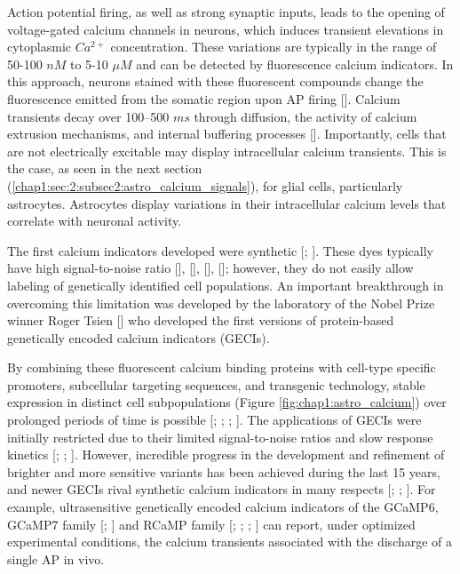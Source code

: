 Action potential firing, as well as strong synaptic inputs, leads to the opening of voltage-gated calcium channels in neurons, which induces transient elevations in cytoplasmic $Ca^{2+}$ concentration.
These variations are typically in the range of 50-100 $nM$ to 5-10 $\mu M$ and can be detected by fluorescence calcium indicators.
In this approach, neurons stained with these fluorescent compounds change the fluorescence emitted from the somatic region upon AP firing [\cite{yuste1991}].
Calcium transients decay over 100–500 $ms$ through diffusion, the activity of calcium extrusion mechanisms, and internal buffering processes [\cite{grienberger2012}].
Importantly, cells that are not electrically excitable may display intracellular calcium transients. 
This is the case, as seen in the next section (\ref{chap1:sec:2:subsec2:astro_calcium_signals}), for glial cells, particularly astrocytes.
Astrocytes display variations in their intracellular calcium levels that correlate with neuronal activity.  
  
The first calcium indicators developed were synthetic [\cite{grienberger2012}; \cite{tsien1981}]. 
These dyes typically have high signal-to-noise ratio [\cite{stosiek2003}], [\cite{grienberger2012}], [\cite{wiederschain2011}], [\cite{helmchen2002}]; however, they do not easily allow labeling of genetically identified cell populations.
An important breakthrough in overcoming this limitation was developed by the laboratory of the Nobel Prize winner Roger Tsien [\cite{miyawaki1997}] who developed the first versions of protein-based genetically encoded calcium indicators (GECIs). 

By combining these fluorescent calcium binding proteins with cell-type specific promoters, subcellular targeting sequences, and transgenic technology, stable expression in distinct cell subpopulations (Figure \ref{fig:chap1:astro_calcium}) over prolonged periods of time is possible [\cite{grienberger2012}; \cite{knopfel2006}; \cite{looger2012}; \cite{chen2013}]. 
The applications of GECIs were initially restricted due to their limited signal-to-noise ratios and slow response kinetics [\cite{ohkura2005}; \cite{tallini2006}; \cite{tian2009}]. 
However, incredible progress in the development and refinement of brighter and more sensitive variants has been achieved during the last 15 years, and newer GECIs rival synthetic calcium indicators in many respects [\cite{horikawa2010}; \cite{palmer2011}; \cite{akerboom2012}]. 
For example, ultrasensitive genetically encoded calcium indicators of the GCaMP6, GCaMP7 family [\cite{chen2013}; \cite{dana2019}] and RCaMP family [\cite{akerboom2013}; \cite{dana2016}; \cite{ohkura2012}; \cite{forli2018}] can report, under optimized experimental conditions, the calcium transients associated with the discharge of a single AP in vivo.
